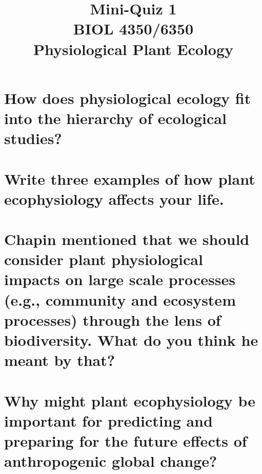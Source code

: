\documentclass[12pt, notitlepage]{article}   	%
\title{
	\textbf{
		Mini-Quiz 1
	} \\
	\large BIOL 4350/6350 \\
	\large Physiological Plant Ecology \\
}
\date{\vspace{-5ex}}
\def\wl{\par \vspace{\baselineskip}}
\begin{document}
{\selectfont %

\maketitle

\section{\small{How does physiological ecology fit into the 
hierarchy of ecological studies?}}
\wl
\wl
\wl
\wl
\wl
\wl
\wl
\wl
\wl
\wl
\wl
\wl
\wl
\wl

\section{\small{Write three examples of how plant ecophysiology affects your life.}}

\newpage

\section{\small{Chapin mentioned that we should consider plant physiological impacts on
large scale processes (e.g., community and ecosystem processes) through the lens of
biodiversity. What do you think he meant by that?}}

\wl
\wl
\wl
\wl
\wl
\wl
\wl
\wl
\wl
\wl
\wl
\wl
\wl
\wl

\section{\small{Why might plant ecophysiology be important for predicting and preparing for
the future effects of anthropogenic global change?}}

} %
\end{document}
